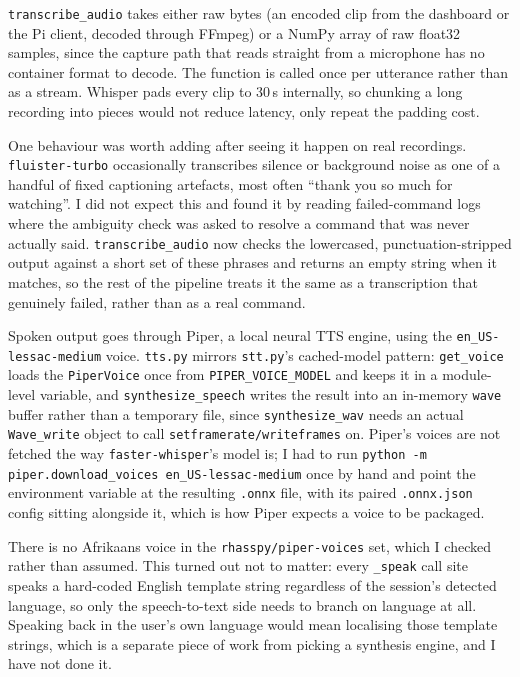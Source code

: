 \texttt{transcribe\_audio} takes either raw bytes (an encoded clip from the
dashboard or the Pi client, decoded through FFmpeg) or a NumPy array of raw
float32 samples, since the capture path that reads straight from a microphone has
no container format to decode. The function is called once per utterance rather
than as a stream. Whisper pads every clip to 30\,s internally, so chunking a long
recording into pieces would not reduce latency, only repeat the padding cost.

One behaviour was worth adding after seeing it happen on real recordings.
\texttt{fluister-turbo} occasionally transcribes silence or background noise as
one of a handful of fixed captioning artefacts, most often ``thank you so much
for watching''. I did not expect this and found it by reading failed-command
logs where the ambiguity check was asked to resolve a command that was never
actually said. \texttt{transcribe\_audio} now checks the lowercased, punctuation-stripped
output against a short set of these phrases and returns an empty string
when it matches, so the rest of the pipeline treats it the same as a transcription
that genuinely failed, rather than as a real command.

\label{ssec:tts}

Spoken output goes through Piper, a local neural TTS engine, using the
\texttt{en\_US-lessac-medium} voice. \texttt{tts.py} mirrors \texttt{stt.py}'s
cached-model pattern: \texttt{get\_voice} loads the \texttt{PiperVoice} once
from \texttt{PIPER\_VOICE\_MODEL} and keeps it in a module-level variable, and
\texttt{synthesize\_speech} writes the result into an in-memory \texttt{wave}
buffer rather than a temporary file, since \texttt{synthesize\_wav} needs an
actual \texttt{Wave\_write} object to call \texttt{setframerate}\allowbreak\texttt{/writeframes}
on. Piper's voices are not fetched the way \texttt{faster-whisper}'s model is;
I had to run \texttt{python -m piper.\allowbreak download\_voices en\_US-\allowbreak lessac-medium} once
by hand and point the environment variable at the resulting \texttt{.onnx} file,
with its paired \texttt{.onnx.json} config sitting alongside it, which is how
Piper expects a voice to be packaged.

There is no Afrikaans voice in the \texttt{rhasspy/\allowbreak piper-voices} set, which I
checked rather than assumed. This turned out not to matter: every \texttt{\_speak}
call site speaks a hard-coded English template string regardless of the
session's detected language, so only the speech-to-text side needs to branch on
language at all. Speaking back in the user's own language would mean
localising those template strings, which is a separate piece of work from
picking a synthesis engine, and I have not done it.

